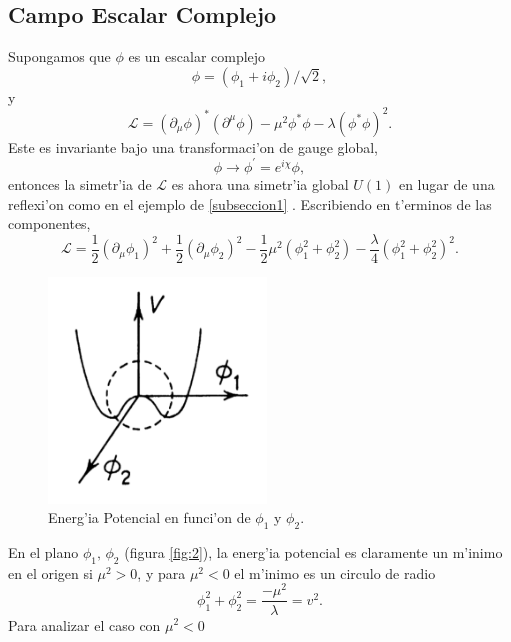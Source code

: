 \subsection{Campo Escalar Complejo}
Supongamos que $\phi$
  es un escalar complejo 
\begin{equation}
\phi=(\phi_{1}+i\phi_{2})/\sqrt{2},
\end{equation}  
y  
\begin{equation}
\mathcal{L}=(\partial_{\mu}\phi)^{*}(\partial^{\mu}\phi)-\mu^{2}\phi^{*}\phi-\lambda(\phi^{*}\phi)^{2}.
\end{equation}
Este es invariante bajo una transformaci'on de gauge global,
\begin{equation}
\phi\rightarrow\phi^{\prime}=e^{i\chi}\phi,
\end{equation}
entonces la simetr'ia de $\mathcal{L}$
  es ahora una simetr'ia global $U(1)$
  en lugar de una reflexi'on como en el ejemplo de \ref{subseccion1} . Escribiendo en t'erminos de las componentes,
  \begin{equation}\label{ecuacion8.11}
  \mathcal{L}=\frac{1}{2}(\partial_{\mu}\phi_{1})^{2}+\frac{1}{2}(\partial_{\mu}\phi_{2})^{2}-\frac{1}{2}\mu^{2}(\phi_{1}^{2}+\phi_{2}^{2})-\frac{\lambda}{4}(\phi_{1}^{2}+\phi_{2}^{2})^{2}.
  \end{equation}
  \begin{figure}[H]
 \centering
\includegraphics[height=6cm,angle=0]{IMAGEN2.pdf}
\caption{Energ'ia Potencial en funci'on de $\phi_{1}$ y $\phi_{2}$.}
\label{fig:2}
\end{figure}
 En el plano $\phi_{1},\,\phi_{2}$
  (figura \eqref{fig:2}), la energ'ia potencial es claramente un m'inimo en el origen si $\mu^{2}>0$,
  y para $\mu^{2}<0$
  el m'inimo es un circulo de radio 
\begin{equation}
\phi_{1}^{2}+\phi_{2}^{2}=\frac{-\mu^{2}}{\lambda}=v^{2}.
\end{equation}
Para analizar el caso con $\mu^{2}<0$
